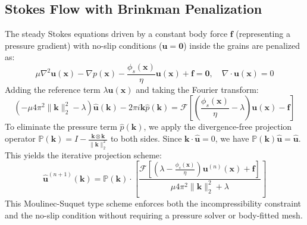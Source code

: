 \documentclass[preprint,12pt]{elsarticle}
\newcommand{\x}{\mathbf{x}}
\newcommand{\kvec}{\mathbf{k}}
\newcommand{\bfu}{\mathbf{u}}
\begin{document}
\subsection{Stokes Flow with Brinkman Penalization}
The steady Stokes equations driven by a constant body force $\mathbf{f}$ (representing a pressure gradient) with no-slip conditions ($\bfu = \mathbf{0}$) inside the grains are penalized as:
\begin{equation}
\mu \nabla^2 \bfu(\x) - \nabla p(\x) - \frac{\phi_s(\x)}{\eta} \bfu(\x) + \mathbf{f} = \mathbf{0}, \quad \nabla \cdot \bfu(\x) = 0
\end{equation}
Adding the reference term $\lambda \bfu(\x)$ and taking the Fourier transform:
\begin{equation}
\left( -\mu 4\pi^2 \|\kvec\|_2^2 - \lambda \right) \widehat{\bfu}(\kvec) - 2\pi i \kvec \widehat{p}(\kvec) = \mathcal{F}\left[ \left( \frac{\phi_s(\x)}{\eta} - \lambda \right) \bfu(\x) - \mathbf{f} \right]
\end{equation}
To eliminate the pressure term $\widehat{p}(\kvec)$, we apply the divergence-free projection operator $\mathbb{P}(\kvec) = I - \frac{\kvec \otimes \kvec}{\|\kvec\|_2^2}$ to both sides. Since $\kvec \cdot \widehat{\bfu} = 0$, we have $\mathbb{P}(\kvec) \widehat{\bfu} = \widehat{\bfu}$. This yields the iterative projection scheme:
\begin{equation}
\label{eq:spectral_stokes_iter}
\widehat{\bfu}^{(n+1)}(\kvec) = \mathbb{P}(\kvec) \cdot \left[ \frac{\mathcal{F}\left[ \left( \lambda - \frac{\phi_s(\x)}{\eta} \right) \bfu^{(n)}(\x) + \mathbf{f} \right]}{\mu 4\pi^2 \|\kvec\|_2^2 + \lambda} \right]
\end{equation}
This Moulinec-Suquet type scheme \citep{monchiet2013polarization} enforces both the incompressibility constraint and the no-slip condition without requiring a pressure solver or body-fitted mesh.
\end{document}
